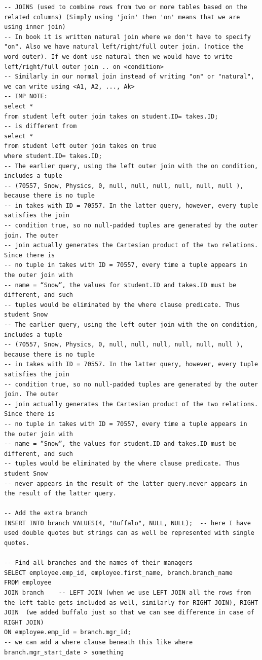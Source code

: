 \documentclass[8pt, a4paper, oneside, twocolumn]{extarticle}
\begin{document}
\begin{verbatim}
-- JOINS (used to combine rows from two or more tables based on the related columns) (Simply using 'join' then 'on' means that we are using inner join)
-- In book it is written natural join where we don't have to specify "on". Also we have natural left/right/full outer join. (notice the word outer). If we dont use natural then we would have to write left/right/full outer join .. on <condition>
-- Similarly in our normal join instead of writing "on" or "natural", we can write using <A1, A2, ..., Ak>
-- IMP NOTE: 
select *
from student left outer join takes on student.ID= takes.ID;
-- is different from 
select *
from student left outer join takes on true
where student.ID= takes.ID;
-- The earlier query, using the left outer join with the on condition, includes a tuple
-- (70557, Snow, Physics, 0, null, null, null, null, null, null ), because there is no tuple
-- in takes with ID = 70557. In the latter query, however, every tuple satisfies the join
-- condition true, so no null-padded tuples are generated by the outer join. The outer
-- join actually generates the Cartesian product of the two relations. Since there is
-- no tuple in takes with ID = 70557, every time a tuple appears in the outer join with
-- name = “Snow”, the values for student.ID and takes.ID must be different, and such
-- tuples would be eliminated by the where clause predicate. Thus student Snow
-- The earlier query, using the left outer join with the on condition, includes a tuple
-- (70557, Snow, Physics, 0, null, null, null, null, null, null ), because there is no tuple
-- in takes with ID = 70557. In the latter query, however, every tuple satisfies the join
-- condition true, so no null-padded tuples are generated by the outer join. The outer
-- join actually generates the Cartesian product of the two relations. Since there is
-- no tuple in takes with ID = 70557, every time a tuple appears in the outer join with
-- name = “Snow”, the values for student.ID and takes.ID must be different, and such
-- tuples would be eliminated by the where clause predicate. Thus student Snow
-- never appears in the result of the latter query.never appears in the result of the latter query.

-- Add the extra branch
INSERT INTO branch VALUES(4, "Buffalo", NULL, NULL);  -- here I have used double quotes but strings can as well be represented with single quotes.

-- Find all branches and the names of their managers
SELECT employee.emp_id, employee.first_name, branch.branch_name
FROM employee
JOIN branch    -- LEFT JOIN (when we use LEFT JOIN all the rows from the left table gets included as well, similarly for RIGHT JOIN), RIGHT JOIN  (we added buffalo just so that we can see difference in case of RIGHT JOIN)
ON employee.emp_id = branch.mgr_id;
-- we can add a where clause beneath this like where branch.mgr_start_date > something


\end{verbatim}
\end{document}
